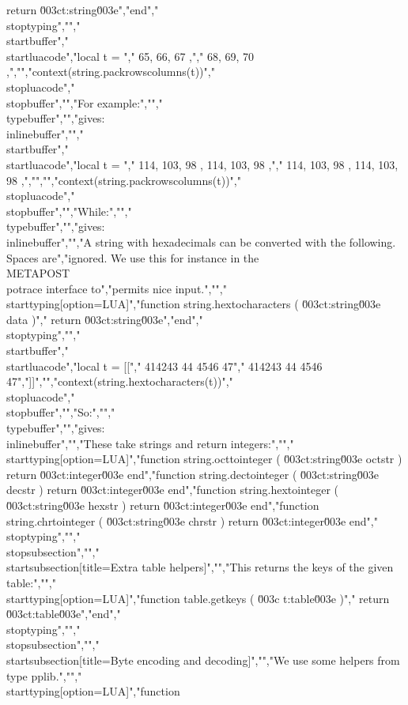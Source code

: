 return \u003ct:string\u003e","end","\\stoptyping","","\\startbuffer","\\startluacode","local t = {","    { 65, 66, 67 },","    { 68, 69, 70 },","}","context(string.packrowscolumns(t))","\\stopluacode","\\stopbuffer","","For example:","","\\typebuffer","","gives: \\inlinebuffer","","\\startbuffer","\\startluacode","local t = {","    { { 114, 103, 98 }, { 114, 103, 98 } },","    { { 114, 103, 98 }, { 114, 103, 98 } },","}","","context(string.packrowscolumns(t))","\\stopluacode","\\stopbuffer","","While:","","\\typebuffer","","gives: \\inlinebuffer","","A string with hexadecimals can be converted with the following. Spaces are","ignored. We use this for instance in the \\METAPOST\\ potrace interface to","permits nice input.","","\\starttyping[option=LUA]","function string.hextocharacters ( \u003ct:string\u003e data )","    return \u003ct:string\u003e","end","\\stoptyping","","\\startbuffer","\\startluacode","local t = [[","  414243 44 4546 47","  414243 44 4546 47","]]","","context(string.hextocharacters(t))","\\stopluacode","\\stopbuffer","","So:","","\\typebuffer","","gives: \\inlinebuffer","","These take strings and return integers:","","\\starttyping[option=LUA]","function string.octtointeger ( \u003ct:string\u003e octstr ) return \u003ct:integer\u003e end","function string.dectointeger ( \u003ct:string\u003e decstr ) return \u003ct:integer\u003e end","function string.hextointeger ( \u003ct:string\u003e hexstr ) return \u003ct:integer\u003e end","function string.chrtointeger ( \u003ct:string\u003e chrstr ) return \u003ct:integer\u003e end","\\stoptyping","","\\stopsubsection","","\\startsubsection[title=Extra table helpers]","","This returns the keys of the given table:","","\\starttyping[option=LUA]","function table.getkeys ( \u003c t:table\u003e )","    return \u003ct:table\u003e","end","\\stoptyping","","\\stopsubsection","","\\startsubsection[title=Byte encoding and decoding]","","We use some helpers from \\type {pplib}.","","\\starttyping[option=LUA]","function 